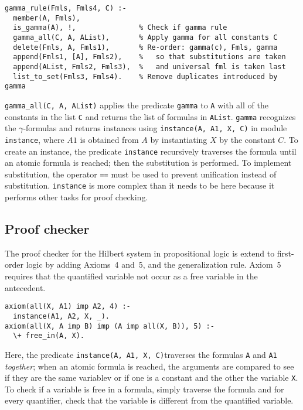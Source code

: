 \documentclass[11pt]{article}
\newcommand*{\p}[1]{\textup{\texttt{#1}}}
\begin{document}
\begin{verbatim}
gamma_rule(Fmls, Fmls4, C) :-
  member(A, Fmls),
  is_gamma(A), !,               % Check if gamma rule
  gamma_all(C, A, AList),       % Apply gamma for all constants C
  delete(Fmls, A, Fmls1),       % Re-order: gamma(c), Fmls, gamma
  append(Fmls1, [A], Fmls2),    %   so that substitutions are taken
  append(AList, Fmls2, Fmls3),  %   and universal fml is taken last
  list_to_set(Fmls3, Fmls4).    % Remove duplicates introduced by gamma
\end{verbatim}

\p{gamma\_all(C, A, AList)} applies the predicate \p{gamma} to \p{A}
with all of the constants in the list \p{C} and returns the list of
formulas in \p{AList}. \p{gamma} recognizes the $\gamma$-formulas and
returns instances using \p{instance(A, A1, X, C)} in module
\p{instance}, where $A1$ is obtained from $A$ by instantiating $X$ by
the constant $C$. To create an instance, the predicate \p{instance}
recursively traverses the formula until an atomic formula is reached;
then the substitution is performed. To implement substitution, the
operator \p{==} must be used to prevent unification instead of
substitution. \p{instance} is more complex than it needs to be here
because it performs other tasks for proof checking.



\subsection{Proof checker}\label{s.checkfol}

The proof checker for the Hilbert system in propositional logic is
extend to first-order logic by adding Axioms~4 and~5, and the
generalization rule. Axiom~5 requires that the quantified variable not
occur as a free variable in the antecedent.

\begin{verbatim}
axiom(all(X, A1) imp A2, 4) :-
  instance(A1, A2, X, _).
axiom(all(X, A imp B) imp (A imp all(X, B)), 5) :-
  \+ free_in(A, X).
\end{verbatim}

Here, the predicate \p{instance(A, A1, X, C)}traverses the formulas
\p{A} and \p{A1} \emph{together}; when an atomic formula is reached, the
arguments are compared to see if they are the same variablev or if one
is a constant and the other the variable \p{X}. To check if a variable
is free in a formula, simply traverse the formula and for every
quantifier, check that the variable is different from the quantified
variable.
\end{document}
